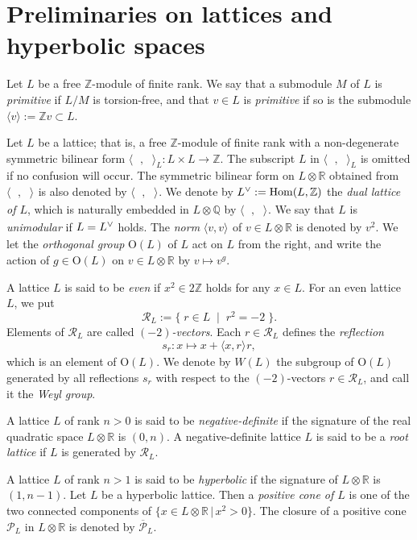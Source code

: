 \documentclass{amsart}
\theoremstyle{plain}
\theoremstyle{definition}
\theoremstyle{remark}
\numberwithin{equation}{section}
\numberwithin{table}{section}
\numberwithin{figure}{section}
\newcommand{\Q}{\mathord{\mathbb  Q}}
\newcommand{\R}{\mathord{\mathbb R}}
\newcommand{\Z}{\mathord{\mathbb Z}}
\newcommand{\PPP}{\mathord{\mathcal P}}
\newcommand{\RRR}{\mathord{\mathcal R}}
\newcommand{\set}[2]{\{\; {#1} \; \mid \; {#2} \;  \}}
\newcommand{\shortset}[2]{\{ {#1} \,|\, {#2}   \}}
\newcommand{\gen}[1]{\langle {#1}  \rangle}
\newcommand{\tensor}{\otimes}
\newcommand{\dual}{\sp{\vee}}
\newcommand{\Hom}{\mathord{\mathrm {Hom}}}
\newcommand{\OG}{\mathord{\mathrm {O}}}
\newcommand{\intM}[2]{\langle{#1}\rangle_{#2}}
\newcommand{\Roots}{\RRR}
\newcommand{\clPPP}{\overline{\PPP}}
\begin{document}
\section{Preliminaries on lattices and hyperbolic spaces}\label{sec:lattice}
%
Let $L$ be a free $\Z$-module of finite rank.
We say that a submodule $M$ of $L$ is \emph{primitive} if $L/M$ is torsion-free,
and 
that $v\in L$ is \emph{primitive} if so is the submodule $\gen{v}:=\Z v\subset L$.
\par
Let $L$ be a lattice;
that is, a free $\Z$-module of finite rank with
a non-degenerate symmetric bilinear form $\intM{\phantom{\cdot}, \phantom{\cdot}}{L}\colon L\times L\to \Z$.
The subscript $L$ in $\intM{\phantom{\cdot}, \phantom{\cdot}}{L}$ is omitted if no confusion will occur.
The symmetric bilinear form 
on $L\tensor\R$ 
obtained from $\intM{\phantom{\cdot}, \phantom{\cdot}}{}$ 
is also denoted by $\intM{\phantom{\cdot}, \phantom{\cdot}}{}$.
We denote by $L\dual:=\Hom(L, \Z)$ the \emph{dual lattice of $L$},
which is naturally embedded in $L\tensor\Q$ by $\intM{\phantom{\cdot}, \phantom{\cdot}}{}$.
We say that $L$ is \emph{unimodular} if $L=L\dual$ holds.
The  \emph{norm} $\intM{v,v}{}$ of $v\in L\tensor \R$ is denoted by $v^2$.
We let the \emph{orthogonal group} $\OG(L)$ of $L$  act on $L$ from the right,
and write the action of $g\in \OG(L)$ on $v\in L\tensor\R$ by $v\mapsto v^g$.
\par
A lattice $L$ is said to be \emph{even} if $x^2\in 2\Z$ holds  for any $x\in L$.
For an even lattice $L$,
we put
$$
\Roots_L:=\set{r\in L}{r^2=-2}.
$$
Elements of $\Roots_L$ are called \emph{$(-2)$-vectors}.
Each $r\in \Roots_L$ defines 
the \emph{reflection}
$$
s_r \colon x\mapsto x+\intM{x, r}{} r,
$$
which is an element of $\OG(L)$.
We denote by $W(L)$ the subgroup of $\OG(L)$ 
generated by all  reflections $s_r$
with respect to  the $(-2)$-vectors $r\in \Roots_L$,
and call it the \emph{Weyl group}.
\par
A lattice $L$ of rank $n>0$ is said to be \emph{negative-definite}  if the signature of the real quadratic space
$L\tensor \R$  is $(0, n)$.
A negative-definite lattice $L$ is said to be a \emph{root lattice}
if $L$ is generated by $\Roots_L$.
\par
A lattice $L$ of rank $n >1$ is said to be \emph{hyperbolic} if the signature of 
$L\tensor \R$  is $(1, n-1)$.
Let $L$ be a hyperbolic lattice.
Then a \emph{positive cone of $L$} is one of the two connected components
of $\shortset{x\in L\tensor\R}{x^2>0}$.
The closure of a positive cone $\PPP_L$ in $L\tensor\R$ is denoted by $\clPPP_L$.
\end{document}
